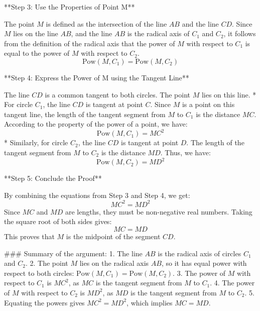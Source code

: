 **Step 3: Use the Properties of Point M**

The point $M$ is defined as the intersection of the line $AB$ and the line $CD$.
Since $M$ lies on the line $AB$, and the line $AB$ is the radical axis of $C_1$ and $C_2$, it follows from the definition of the radical axis that the power of $M$ with respect to $C_1$ is equal to the power of $M$ with respect to $C_2$.
$$ \text{Pow}(M, C_1) = \text{Pow}(M, C_2) $$

**Step 4: Express the Power of M using the Tangent Line**

The line $CD$ is a common tangent to both circles. The point $M$ lies on this line.
*   For circle $C_1$, the line $CD$ is tangent at point $C$. Since $M$ is a point on this tangent line, the length of the tangent segment from $M$ to $C_1$ is the distance $MC$.
    According to the property of the power of a point, we have:
    $$ \text{Pow}(M, C_1) = MC^2 $$
*   Similarly, for circle $C_2$, the line $CD$ is tangent at point $D$. The length of the tangent segment from $M$ to $C_2$ is the distance $MD$.
    Thus, we have:
    $$ \text{Pow}(M, C_2) = MD^2 $$

**Step 5: Conclude the Proof**

By combining the equations from Step 3 and Step 4, we get:
$$ MC^2 = MD^2 $$
Since $MC$ and $MD$ are lengths, they must be non-negative real numbers. Taking the square root of both sides gives:
$$ MC = MD $$
This proves that $M$ is the midpoint of the segment $CD$.

### Summary of the argument:
1.  The line $AB$ is the radical axis of circles $C_1$ and $C_2$.
2.  The point $M$ lies on the radical axis $AB$, so it has equal power with respect to both circles: $\text{Pow}(M, C_1) = \text{Pow}(M, C_2)$.
3.  The power of $M$ with respect to $C_1$ is $MC^2$, as $MC$ is the tangent segment from $M$ to $C_1$.
4.  The power of $M$ with respect to $C_2$ is $MD^2$, as $MD$ is the tangent segment from $M$ to $C_2$.
5.  Equating the powers gives $MC^2 = MD^2$, which implies $MC=MD$.